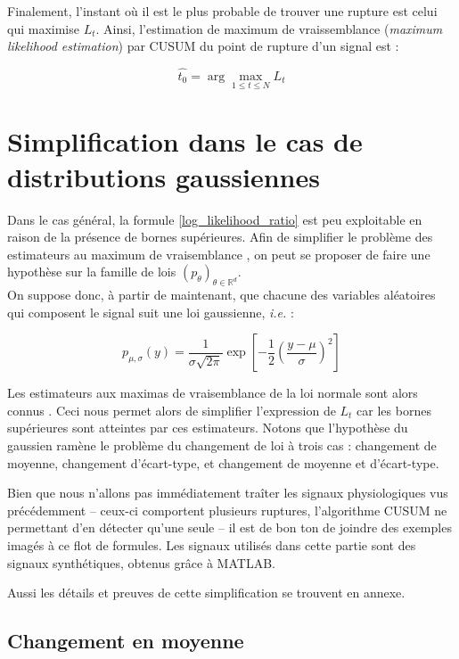 \documentclass[french,11pt,notitlepage]{report}
\begin{document}
	Finalement, l'instant où il est le plus probable de trouver une rupture est celui qui maximise $L_t$.
	Ainsi, l'estimation de maximum de vraissemblance (\emph{maximum likelihood estimation}) par CUSUM du point de rupture d'un signal est :
	
	\begin{equation}
		\hat{t_0}=\arg\max_{1\le t\le N}L_t
	\end{equation}
	
	
	\section{Simplification dans le cas de distributions gaussiennes}

	
	Dans le cas général, la formule \ref{log_likelihood_ratio} est peu exploitable en raison de la présence de bornes supérieures.
	Afin de simplifier le problème des estimateurs au maximum de vraisemblance
	, on peut se proposer de faire une hypothèse sur la famille de lois $(p_\theta)_{\theta \in \mathbb{R}^d}$.
	\\
	
	On suppose donc, à partir de maintenant, que chacune des variables aléatoires qui composent le signal suit une loi gaussienne, \emph{i.e.} :
	
	\begin{equation*}
		p_{\mu, \sigma}(y) = \frac1{\sigma\sqrt{2 \pi}} \exp \left[ -\frac12 \left( \frac{y - \mu}{\sigma} \right)^2 \right]
	\end{equation*}
	
	Les estimateurs aux maximas de vraisemblance de la loi normale sont alors connus \cite{MLE}.
	Ceci nous permet alors de simplifier l'expression de $L_t$
	car les bornes supérieures sont atteintes par ces estimateurs.
	Notons que l'hypothèse du gaussien ramène le problème du changement de loi à trois cas :
	changement de moyenne, changement d'écart-type, et changement de moyenne et d'écart-type.
	
		Bien que nous n'allons pas immédiatement traîter les signaux physiologiques vus précédemment --
	ceux-ci comportent plusieurs ruptures, l'algorithme CUSUM ne permettant d'en détecter qu'une seule -- il est de bon ton de joindre des exemples imagés à ce flot de formules.
	Les signaux utilisés dans cette partie sont des signaux synthétiques, obtenus grâce à MATLAB.
	
		Aussi les détails et preuves de cette simplification se trouvent en annexe.
		
	
	\subsection{Changement en moyenne}
	
\end{document}
